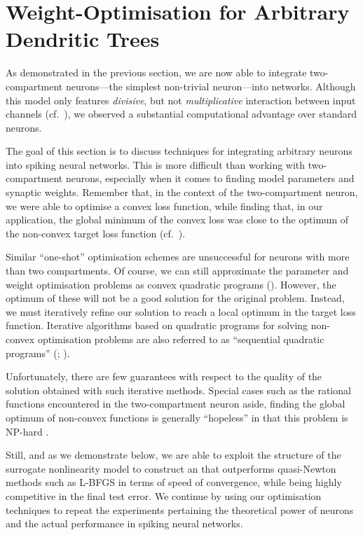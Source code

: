 
\section{Weight-Optimisation for Arbitrary Dendritic Trees}
\label{sec:nlif_opt}

As demonstrated in the previous section, we are now able to integrate two-compartment \LIF neurons---the simplest non-trivial \nlif neuron---into \NEF networks.
Although this model only features \emph{divisive}, but not \emph{multiplicative} interaction between input channels (cf.~), we observed a substantial computational advantage over standard \LIF neurons.

The goal of this section is to discuss techniques for integrating arbitrary \nlif neurons into spiking neural networks.
This is more difficult than working with two-compartment \LIF neurons, especially when it comes to finding model parameters and synaptic weights.
Remember that, in the context of the two-compartment \LIF neuron, we were able to optimise a convex loss function, while finding that, in our application, the global minimum of the convex loss was close to the optimum of the non-convex target loss function (cf.~).

Similar \enquote{one-shot} optimisation schemes are unsuccessful for \nlif neurons with more than two compartments.
Of course, we can still approximate the parameter and weight optimisation problems as convex quadratic programs (\QPpl).
However, the optimum of these \QPpl will not be a good solution for the original problem.
Instead, we must iteratively refine our solution to reach a local optimum in the target loss function.
Iterative algorithms based on quadratic programs for solving non-convex optimisation problems are also referred to as \enquote{sequential quadratic programs} (\SQPpl; \cite[e.g.,][Chapter~18]{nocedal2006numerical}).

Unfortunately, there are few guarantees with respect to the quality of the solution obtained with such iterative methods.
Special cases such as the rational functions encountered in the two-compartment \LIF neuron aside, finding the global optimum of non-convex functions is generally \enquote{hopeless} in that this problem is NP-hard \citep[e.g.,]{sun2016when}.

Still, and as we demonstrate below, we are able to exploit the structure of the surrogate nonlinearity model \Hden to construct an \SQP that outperforms quasi-Newton methods such as L-BFGS in terms of speed of convergence, while being highly competitive in the final test error.
We continue by using our optimisation techniques to repeat the experiments pertaining the theoretical power of \nlif neurons and the actual performance in spiking neural networks.

